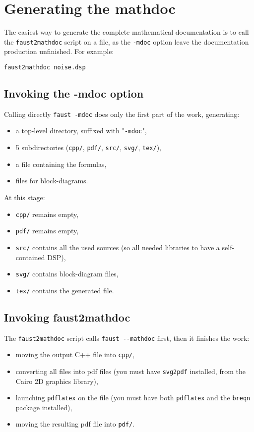 \section{Generating the mathdoc}
\label{generating-mdoc}

The easiest way to generate the complete mathematical documentation is to call the \lstinline!faust2mathdoc! script on a \faust file, as the \lstinline!-mdoc! option leave the documentation production unfinished. For example: 
\begin{lstlisting}
faust2mathdoc noise.dsp
\end{lstlisting}

\subsection{Invoking the -mdoc option}
\label{invoking-mdoc}

Calling directly \lstinline!faust -mdoc! does only the first part of the work, generating:
\begin{itemize}
\item a top-level directory, suffixed with "\texttt{-mdoc}",
\item 5 subdirectories (\lstinline!cpp/!, \lstinline!pdf/!, \lstinline!src/!, \lstinline!svg/!, \lstinline!tex/!),
\item a \latex file containing the formulas,
\item \svg files for block-diagrams.
\end{itemize}

At this stage:
\begin{itemize}
\item \lstinline!cpp/! remains empty,
\item \lstinline!pdf/! remains empty,
\item \lstinline!src/! contains all the used \faust sources (so all needed libraries to have a self-contained DSP), 
\item \lstinline!svg/! contains \svg block-diagram files,
\item \lstinline!tex/! contains the generated \latex file.
\end{itemize}

\subsection{Invoking faust2mathdoc}
\label{invok-faust2m}

The \lstinline!faust2mathdoc! script calls \lstinline!faust --mathdoc! first, then it finishes the work:
\begin{itemize}
\item moving the output C++ file into \lstinline!cpp/!,
\item converting all \svg files into pdf files (you must have \lstinline!svg2pdf! installed, from the Cairo 2D graphics library),
\item launching \lstinline!pdflatex! on the \latex file (you must have both \lstinline!pdflatex! and the \lstinline!breqn! package installed),
\item moving the resulting pdf file into \lstinline!pdf/!.
\end{itemize}

